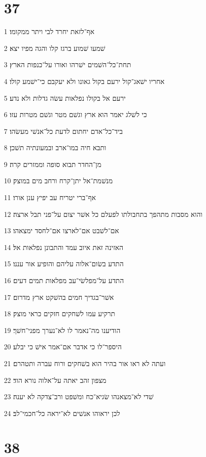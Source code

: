 \chapter{37}

\par 1 אף־לזאת יחרד לבי ויתר ממקומו׃
\par 2 שׁמעו שׁמוע ברגז קלו והגה מפיו יצא׃
\par 3 תחת־כל־השׁמים ישׁרהו ואורו על־כנפות הארץ׃
\par 4 אחריו ישׁאג־קול ירעם בקול גאונו ולא יעקבם כי־ישׁמע קולו׃
\par 5 ירעם אל בקולו נפלאות עשׂה גדלות ולא נדע׃
\par 6 כי לשׁלג יאמר הוא ארץ וגשׁם מטר וגשׁם מטרות עזו׃
\par 7 ביד־כל־אדם יחתום לדעת כל־אנשׁי מעשׂהו׃
\par 8 ותבא חיה במו־ארב ובמעונתיה תשׁכן׃
\par 9 מן־החדר תבוא סופה וממזרים קרה׃
\par 10 מנשׁמת־אל יתן־קרח ורחב מים במוצק׃
\par 11 אף־ברי יטריח עב יפיץ ענן אורו׃
\par 12 והוא מסבות מתהפך בתחבולתו לפעלם כל אשׁר יצום על־פני תבל ארצה׃
\par 13 אם־לשׁבט אם־לארצו אם־לחסד ימצאהו׃
\par 14 האזינה זאת איוב עמד והתבונן נפלאות אל׃
\par 15 התדע בשׂום־אלוה עליהם והופיע אור עננו׃
\par 16 התדע על־מפלשׂי־עב מפלאות תמים דעים׃
\par 17 אשׁר־בגדיך חמים בהשׁקט ארץ מדרום׃
\par 18 תרקיע עמו לשׁחקים חזקים כראי מוצק׃
\par 19 הודיענו מה־נאמר לו לא־נערך מפני־חשׁך׃
\par 20 היספר־לו כי אדבר אם־אמר אישׁ כי יבלע׃
\par 21 ועתה לא ראו אור בהיר הוא בשׁחקים ורוח עברה ותטהרם׃
\par 22 מצפון זהב יאתה על־אלוה נורא הוד׃
\par 23 שׁדי לא־מצאנהו שׂגיא־כח ומשׁפט ורב־צדקה לא יענה׃
\par 24 לכן יראוהו אנשׁים לא־יראה כל־חכמי־לב׃

\chapter{38}

